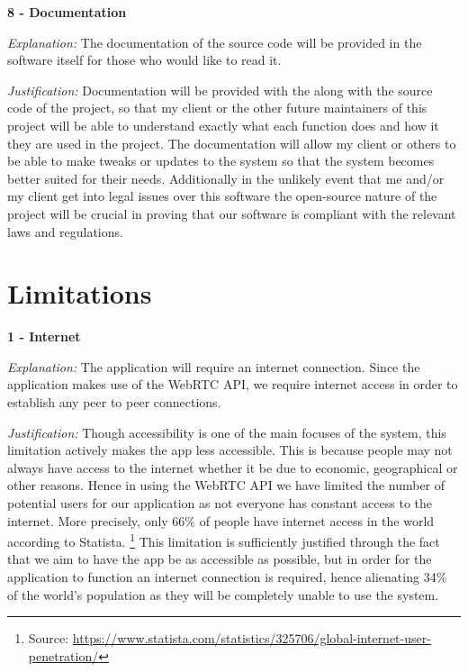 \textsf{\bfseries 8 - Documentation} \\ \vspace{0.1cm}

\textit{Explanation:}
The documentation of the source code will be provided in the
software itself for those who would like to read it.
\vspace{0.1cm}

\textit{Justification:} 
Documentation will be provided with the along with the source code
of the project, so that my client or the other future maintainers
of this project will be able to understand exactly what each
function does and how it they are used in the project. The 
documentation will allow my client or others to be able to make 
tweaks or updates to the system so that the system becomes better
suited for their needs. Additionally in the unlikely event that me
and/or my client get into legal issues over this software the 
open-source nature of the project will be crucial in proving that
our software is compliant with the relevant laws and regulations.

\section{Limitations}

\textsf{\bfseries 1 - Internet} \\ \vspace{0.1cm} 

\textit{Explanation:}
The application will require an internet connection. Since the
application makes use of the WebRTC API, we require internet 
access in order to establish any peer to peer connections.
\vspace{0.1cm}

\textit{Justification:}
Though accessibility is one of the main focuses of the system,
this limitation actively makes the app less accessible. This
is because people may not always have access to the internet 
whether it be due to economic, geographical or other reasons.
Hence in using the WebRTC API we have limited the number of 
potential users for our application as not everyone has 
constant access to the internet. More precisely, only 66\% of 
people have internet access in the world according to Statista.
\footnote{Source: \url{https://www.statista.com/statistics/325706/global-internet-user-penetration/}}
This limitation is sufficiently justified through the fact that
we aim to have the app be as accessible as possible, but in 
order for the application to function an internet connection is
required, hence alienating 34\% of the world's population as they
will be completely unable to use the system. \\ \vspace{0.2cm}

